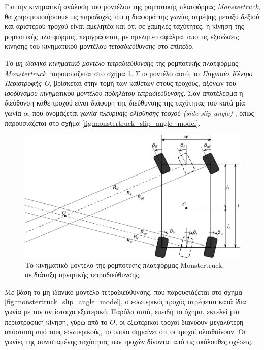\bigskip
Για την κινηματική ανάλυση του μοντέλου της ρομποτικής πλατφόρμας \textit{Monstertruck}, θα χρησιμοποιήσουμε τις παραδοχές, ότι η διαφορά της γωνίας στρέψης μεταξύ δεξιού και αριστερού τροχού είναι αμελητέα και ότι σε χαμηλές ταχύτητες, η κίνηση της ρομποτικής πλατφόρμας, περιγράφεται, με αμελητέο σφάλμα, από τις εξισώσεις κίνησης του κινηματικού μοντέλου \textit{τετραδιεύθυνσης} στο επίπεδο.


\bigskip
Το \textit{μη ιδανικό κινηματικό μοντέλο τετραδιεύθυνσης} της ρομποτικής πλατφόρμας \textit{Monstertruck}, παρουσιάζεται στο σχήμα \ref{fig:monstetruck_model}. Στο μοντέλο αυτό, το \textit{Στιγμιαίο Κέντρο Περιστροφής Ο}, βρίσκεται στην τομή των κάθετων στους τροχούς, αξόνων του \textit{ισοδύναμου κινηματικού μοντέλου ποδηλάτου τετραδιεύθυνσης}. Σαν αποτέλεσμα η διεύθυνση κάθε τροχού είναι διάφορη της διεύθυνσης της ταχύτητας του κατά μία γωνία $\alpha$, που ονομάζεται \textit{γωνία πλευρικής ολίσθησης τροχού (side slip angle)} \cite{4ws_kinematics}, όπως παρουσιάζεται στο σχήμα \ref{fig:monstertruck_slip_angle_model}.


\begin{figure}[!ht]
	\centering
	\includegraphics[width=0.7\linewidth]{Chapters/Chapter2/Figures/monstertruck_model_parallel.png}
	\caption{Το κινηματικό μοντέλο της ρομποτικής πλατφόρμας Monstertruck,\\ σε διάταξη αρνητικής τετραδιεύθυνσης.}
	\label{fig:monstetruck_model}
\end{figure}

\bigskip
Με βάση το μη ιδανικό μοντέλο τετραδιεύθυνσης, που παρουσιάζεται στο σχήμα \ref{fig:monstertruck_slip_angle_model}, ο εσωτερικός τροχός στρέφεται κατά ίδια γωνία με τον αντίστοιχο εξωτερικό. Παρόλα αυτά, επειδή το όχημα, εκτελεί μία περιστροφική κίνηση, γύρω από το $O$, οι εξωτερικοί τροχοί διανύουν μεγαλύτερη απόσταση από τους εσωτερικούς, το οποίο σημαίνει ότι οι τροχοί ολισθαίνουν. Οι γωνίες της συνισταμένης ταχύτητας των τροχών δίνονται από τις ακόλουθες σχέσεις.

